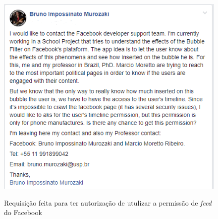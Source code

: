 \documentclass[
	12pt,				%
	oneside,			%
	a4paper,			%
	english,			%
	brazil				%
	]{abntex2ppgsi}
\begin{document}
\begin{anexosenv}
\begin{figure}[H]
	\centering
	\caption{Requisição feita para ter autorização de utulizar a permissão de \textit{feed} do Facebook}
	\includegraphics[scale=1]{request.png}
	\label{fig:request}
\end{figure}




\end{anexosenv}

\end{document}
